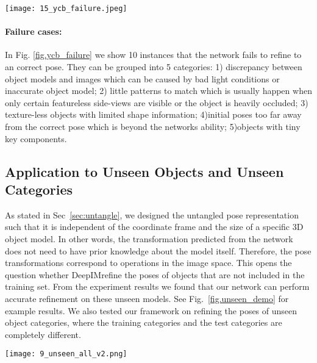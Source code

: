 \documentclass[twocolumn]{svjour3}
\newcommand{\dimnet}[0]{DeepIM}
\begin{document}
\begin{figure*}[t]
	\centering
	\texttt{[image: 15\_ycb\_failure.jpeg]}
\caption{Failure cases in YCB-Video dataset.}
\label{fig.ycb_failure}
\end{figure*}

\paragraph{Failure cases:}
In Fig. \ref{fig.ycb_failure} we show 10 instances that the network fails to refine to an correct pose. They can be grouped into 5 categories: 1) discrepancy between object models and images which can be caused by bad light conditions or inaccurate object model; 2) little patterns to match which is usually happen when only certain featureless side-views are visible or the object is heavily occluded; 3) texture-less objects with limited shape information; 4)initial poses too far away from the correct pose which is beyond the networks ability; 5)objects with tiny key components.


\subsection{Application to Unseen Objects and Unseen Categories}

As stated in Sec~\ref{sec:untangle}, we designed the untangled pose representation such that it is independent of the coordinate frame and the size of a specific 3D object model. In other words, the transformation predicted from the network does not need to have prior knowledge about the model itself. Therefore, the pose transformations correspond to operations in the image space. This opens the question whether \dimnet\can refine the poses of objects that are not included in the training set. From the experiment results we found that our network can perform accurate refinement on these unseen models. See Fig.~\ref{fig.unseen_demo} for example results. We also tested our framework on refining the poses of unseen object categories, where the training categories and the test categories are completely different. 

\begin{figure*}[t]
	\centering
	\texttt{[image: 9\_unseen\_all\_v2.png]}
\caption{Results on pose refinement of 3D models from the ModelNet dataset. These instances were not seen in training. The red and green lines represent the edges of the initial estimates and our refined poses.}
\label{fig.unseen_demo}
\end{figure*}
\end{document}
